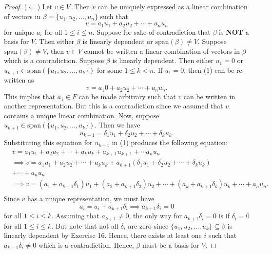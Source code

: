 \begin{proof}
(\( \Leftarrow \)) Let \( v \in V  \). Then \( v  \) can be uniquely expressed as a linear combination of vectors in \( \beta = \{ u_{1}, u_{2}, \dots, u_{n} \}  \) such that 
\[  v = a_{1} u_{1} + a_{2} u_{2} + \cdots + a_{n} u_{n} \tag{1} \]
for unique \( a_{i}  \) for all \(  1 \leq i \leq n \). Suppose for sake of contradiction that \( \beta  \) is \textbf{NOT} a basis for \( V  \). Then either \( \beta   \) is linearly dependent or \( \text{span}(\beta) \neq  V  \). Suppose \( \text{span}(\beta) \neq V  \), then \( v \in V  \) cannot be written a linear combination of vectors in \( \beta \) which is a contradiction. Suppose \( \beta \) is linearly dependent. Then either \( u_{1} = 0  \) or \( u_{k+1} \in \text{span}(\{ u_{1}, u_{2} , \dots, u_{k }  \} ) \) for some \(  1 \leq  k < n  \). If \( u_{1} = 0  \), then (1) can be re-written as
\[ v = a_{1} 0 + a_{2} u_{2} + \cdots + a_{n} u_{n}.   \]
This implies that \( a_{1} \in F  \) can be made arbitrary such that \( v  \) can be written in another representation. But this is a contradiction since we assumed that \( v  \) contains a unique linear combination. Now, suppose \( u_{k+1} \in \text{span}(\{ u_{1} , u_{2}, \dots, u_{k } \} ) \). Then we have 
\[  u_{k+1} = \delta_{1} u_{1} + \delta_{2} u_{2} + \cdots + \delta_{k} u_{k }.  \]
Substituting this equation for \( u_{k+1} \) in (1) produces the following equation:
\begin{align*}
    &v = a_{1} u_{1} +a_{2} u_{2} + \cdots + a_{k} u_{k} + a_{k+1} u_{k+1} + \cdots a_{n} u_{n}  \\
    &\implies v =  a_{1} u_{1} + a_{2} u_{2} + \cdots + a_{k} u_{k } + a_{k+1} ( \delta_{1} u_{1} + \delta_{2} u_{2} + \cdots + \delta_{k} u_{k }  ) \\ 
    &+ \cdots +  a_{n} u_{n} \\
    &\implies v = (a_{1} + a_{k+1} \delta_{1}) u_{1} +  (a_{2} + a_{k+1} \delta_{2}) u_{2} + \cdots + (a_{k } + a_{k+1} \delta_{k } ) u_{k } + \cdots + a_{n} u_{n}. \tag{2} \\
\end{align*}
Since \( v  \) has a unique representation, we must have 
\[  a_{i} = a_{i} + a_{k+1} \delta_{i } \implies  a_{k+1}\delta_{i} = 0 \tag{3}  \] 
for all \( 1 \leq i \leq k  \). Assuming that \( a_{k+1} \neq 0  \), the only way for \( a_{k+1} \delta_{i} = 0  \) is if \( \delta_{i} = 0   \) for all \( 1 \leq i \leq k    \). But note that not all \( \delta_{i}  \) are zero since \( \{ u_{1}, u_{2}, \dots, u_{k } \} \subseteq \beta \) is linearly dependent by Exercise 16. Hence, there exists at least one \( i  \) such that \( a_{k+1} \delta_{i} \neq  0  \) which is a contradiction. Hence, \( \beta \) must be a basis for \( V  \).


\end{proof}

